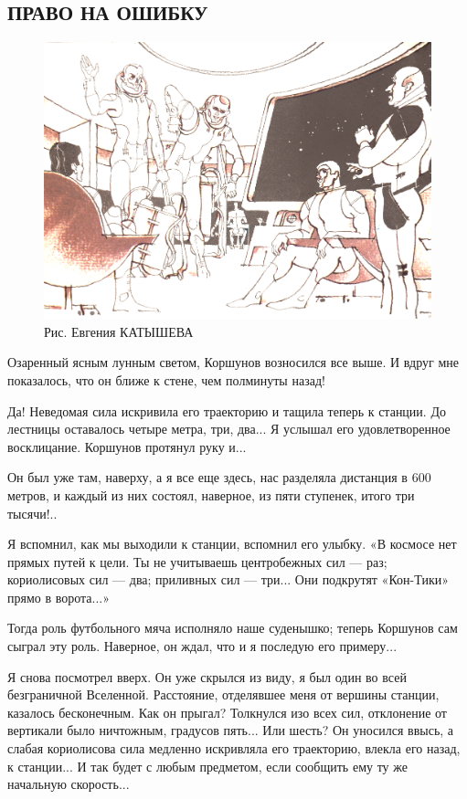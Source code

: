 \documentclass[11pt,a4paper,oneside]{article}
\begin{document}
\subsection{ПРАВО НА ОШИБКУ}
\begin{figure}[H]
\includegraphics[width=\textwidth]{right_to_mistake}
\caption{Рис. Евгения КАТЫШЕВА}
\end{figure}

Озаренный ясным лунным светом, Коршунов возносился все выше. И вдруг мне показалось, что он ближе к стене, чем полминуты назад!

Да! Неведомая сила искривила его траекторию и тащила теперь к станции. До лестницы оставалось четыре метра, три, два... Я услышал его удовлетворенное восклицание. Коршунов протянул руку и...

Он был уже там, наверху, а я все еще здесь, нас разделяла дистанция в 600 метров, и каждый из них состоял, наверное, из пяти ступенек, итого три тысячи!..

Я вспомнил, как мы выходили к станции, вспомнил его улыбку. «В космосе нет прямых путей к цели. Ты не учитываешь центробежных сил — раз; кориолисовых сил — два; приливных сил — три... Они подкрутят «Кон-Тики» прямо в ворота...»

Тогда роль футбольного мяча исполняло наше суденышко; теперь Коршунов сам сыграл эту роль. Наверное, он ждал, что и я последую его примеру...

Я снова посмотрел вверх. Он уже скрылся из виду, я был один во всей безграничной Вселенной. Расстояние, отделявшее меня от вершины станции, казалось бесконечным. Как он прыгал? Толкнулся изо всех сил, отклонение от вертикали было ничтожным, градусов пять... Или шесть? Он уносился ввысь, а слабая кориолисова сила медленно искривляла его траекторию, влекла его назад, к станции... И так будет с любым предметом, если сообщить ему ту же начальную скорость...
\end{document}
